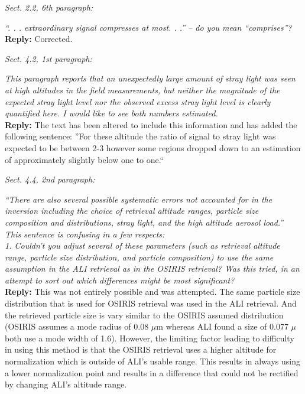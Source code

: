 \documentclass[12pt, notitlepage]{article}
\begin{document}
\hrulefill

\textit{Sect. 2.2, 6th paragraph:}

\textit{``. . . extraordinary signal compresses at most. . .'' – do you mean ``comprises''?}\\

\textbf{Reply:} Corrected.

\hrulefill

\textit{Sect. 4.2, 1st paragraph:}

\textit{This paragraph reports that an unexpectedly large amount of stray light was seen at
high altitudes in the field measurements, but neither the magnitude of the expected
stray light level nor the observed excess stray light level is clearly quantified here. I
would like to see both numbers estimated.}\\

\textbf{Reply:} The text has been altered to include this information and has added the following sentence: ''For these altitude the ratio of signal to stray light was expected to be between 2-3 however some regions dropped down to an estimation of approximately slightly below one to one.``

\hrulefill

\textit{Sect. 4.4, 2nd paragraph:}

\textit{``There are also several possible systematic errors not accounted for in the inversion
including the choice of retrieval altitude ranges, particle size composition and distributions,
stray light, and the high altitude aerosol load.''}\\

\textit{This sentence is confusing in a few respects:}\\

\textit{1. Couldn't you adjust several of these parameters (such as retrieval altitude range,
particle size distribution, and particle composition) to use the same assumption in the
ALI retrieval as in the OSIRIS retrieval? Was this tried, in an attempt to sort out which
differences might be most significant?}\\

\textbf{Reply:} This was not entirely possible and was attempted. The same particle size distribution
that is used for OSIRIS retrieval was used in the ALI retrieval. And the retrieved particle size is vary
similar to the OSIRIS assumed distribution (OSIRIS assumes a mode radius of 0.08 $\mu$m whereas ALI found a size of 0.077 $\mu$ both use a mode width of 1.6).  However, the limiting factor leading to difficulty
in using this method is that the OSIRIS retrieval uses a higher altitude for normalization which
is outside of ALI's usable range. This results in always using a lower normalization point and results in a difference
that could not be rectified by changing ALI's altitude range.\\
\end{document}
